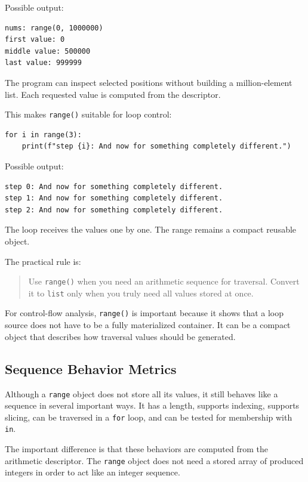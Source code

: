 \documentclass[a4paper,twoside]{report}
\begin{document}
Possible output:

\begin{verbatim}
nums: range(0, 1000000)
first value: 0
middle value: 500000
last value: 999999
\end{verbatim}

The program can inspect selected positions without building a million-element list. Each requested value is computed from the descriptor.

This makes \texttt{range()} suitable for loop control:

\begin{verbatim}
for i in range(3):
    print(f"step {i}: And now for something completely different.")
\end{verbatim}

Possible output:

\begin{verbatim}
step 0: And now for something completely different.
step 1: And now for something completely different.
step 2: And now for something completely different.
\end{verbatim}

The loop receives the values one by one. The range remains a compact reusable object.

The practical rule is:

\begin{quote}
Use \texttt{range()} when you need an arithmetic sequence for traversal. Convert it to \texttt{list} only when you truly need all values stored at once.
\end{quote}

For control-flow analysis, \texttt{range()} is important because it shows that a loop source does not have to be a fully materialized container. It can be a compact object that describes how traversal values should be generated.

\subsection{Sequence Behavior Metrics}

Although a \texttt{range} object does not store all its values, it still behaves like a sequence in several important ways. It has a length, supports indexing, supports slicing, can be traversed in a \texttt{for} loop, and can be tested for membership with \texttt{in}.

The important difference is that these behaviors are computed from the arithmetic descriptor. The \texttt{range} object does not need a stored array of produced integers in order to act like an integer sequence.
\end{document}
